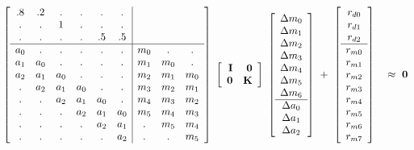 \begin{equation}
\left[ 
\begin{array}{cccccc|ccc}
   .8 & .2 & .   & .   & .   & .  &     &     &     \\
   .  & .  & 1   & .   & .   & .  &     &     &     \\
   .  & .  & .   & .   & .5  & .5 &     &     &     \\
   \hline
   a_0& .  & .   & .   & .   & .   & m_0 & .   & .   \\
   a_1& a_0& .   & .   & .   & .   & m_1 & m_0 & .   \\
   a_2& a_1&  a_0& .   & .   & .   & m_2 & m_1 & m_0 \\
   .  & a_2&  a_1&  a_0& .   & .   & m_3 & m_2 & m_1 \\
   .  & .  &  a_2&  a_1&  a_0& .   & m_4 & m_3 & m_2 \\
   .  & .  & .   &  a_2&  a_1&  a_0& m_5 & m_4 & m_3 \\
   .  & .  & .   & .   &  a_2&  a_1& .   & m_5 & m_4 \\
   .  & .  & .   & .   & .   &  a_2& .   &  .  & m_5 
  \end{array} \right] 
  \ 
\left[
\begin{array}{rr}
  \bold I & \bold 0 \\
  \bold 0 & \bold K
 \end{array} \right]
  \ 
\left[ 
        \begin{array}{c}
          \Delta m_0 \\ 
          \Delta m_1 \\ 
          \Delta m_2 \\ 
          \Delta m_3 \\ 
          \Delta m_4 \\ 
          \Delta m_5 \\ 
          \Delta m_6 \\
          \hline
          \Delta a_0 \\
          \Delta a_1 \\
          \Delta a_2
        \end{array}
\right] 
\ +\ 
\left[ 
\begin{array}{c}
  r_{d0} \\ 
  r_{d1} \\ 
  r_{d2} \\ 
  \hline
  r_{m0}   \\
  r_{m1}   \\
  r_{m2}   \\
  r_{m3}   \\
  r_{m4}   \\
  r_{m5}   \\
  r_{m6}   \\
  r_{m7}
  \end{array} \right] 
\quad \approx \ \bold 0
\label{eqn:biglevint}
\end{equation}
